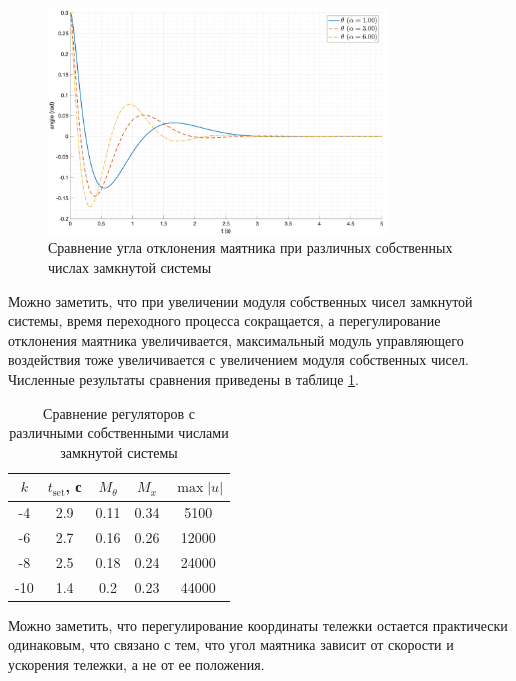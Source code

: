 \begin{figure}[ht!]
    \centering
    \includegraphics[width=0.8\textwidth]{media/plots/modal_controllers/ang_cmp.png}
    \caption{Сравнение угла отклонения маятника при различных собственных числах замкнутой системы}
    \label{fig:modal_controlers_ang_cmp}
\end{figure}
Можно заметить, что при увеличении модуля собственных чисел замкнутой системы, время переходного процесса
сокращается, а перегулирование отклонения маятника увеличивается, максимальный модуль управляющего воздействия 
тоже увеличивается с увеличением модуля собственных чисел. Численные результаты сравнения приведены в таблице \ref{tab:modal_control_cmp}. 

\begin{table}[ht!]
    \centering
    \begin{tabular}{|c|c|c|c|c|}
        \hline
        $k$ & $t_{\text{set}}$, с & $M_{\theta}$ & $M_{x}$ & $\max{|u|}$ \\
        \hline
        -4 & 2.9 & 0.11 & 0.34 & 5100 \\
        \hline
        -6 & 2.7 & 0.16 & 0.26 & 12000 \\
        \hline
        -8 & 2.5 & 0.18 & 0.24 & 24000 \\
        \hline
        -10 & 1.4 & 0.2 & 0.23 & 44000 \\
        \hline
    \end{tabular}
    \caption{Сравнение регуляторов с различными собственными числами замкнутой системы}
    \label{tab:modal_control_cmp}
\end{table}

Можно заметить, что перегулирование координаты тележки остается практически одинаковым, 
что связано с тем, что угол маятника зависит от скорости и ускорения тележки, а не от ее положения. 

